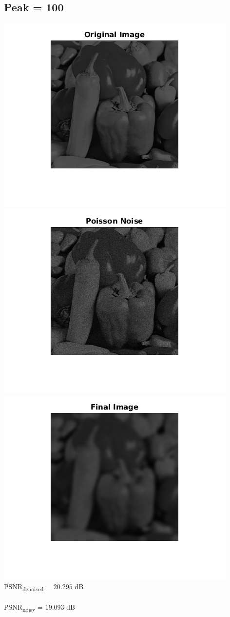 \documentclass{article}
\begin{document}
\subsection*{Peak = 100}
\includegraphics[scale=0.5]{images/peak100_orig}
\includegraphics[scale=0.5]{images/peak100_noisy}
\includegraphics[scale=0.5]{images/peak100_denoised}
\\
PSNR\textsubscript{denoised} = 20.295 dB\\
\\
PSNR\textsubscript{noisy} = 19.093 dB
\end{document}
